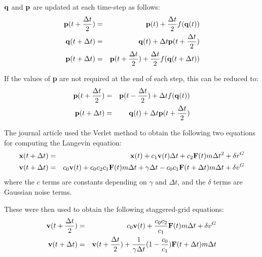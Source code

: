 \documentclass{article}
\begin{document}
${\bf q}$ and ${\bf p}$ are updated at each time-step as follows:
\begin{eqnarray*}
	{\bf p}(t+\frac{\Delta t}{2}) &=& {\bf p}(t) + \frac{\Delta t}{2}f({\bf q}(t))\\
	{\bf q}(t+\Delta t) &=& {\bf q}(t) + \Delta t{\bf p}(t+\frac{\Delta t}{2})\\
	{\bf p}(t+\Delta t) &=& {\bf p}(t+\frac{\Delta t}{2}) + \frac{\Delta t}{2}f({\bf q}(t+\Delta t))
\end{eqnarray*}

If the values of {\bf p} are not required at the end of each step, this can be reduced to:
\begin{eqnarray*}
	{\bf p}(t+\frac{\Delta t}{2}) &=& {\bf p}(t-\frac{\Delta t}{2}) + \Delta tf({\bf q}(t))\\
	{\bf p}(t+\Delta t) &=& {\bf q}(t) + \Delta t{\bf p}(t + \frac{\Delta t}{2})
\end{eqnarray*}

The journal article used the Verlet method to obtain the following two equations for computing the Langevin equation:
\begin{eqnarray*}
	{\bf x}(t+\Delta t) &=& {\bf x}(t) + c_{1}{\bf v}(t)\Delta{t}+c_{2}{\bf F}(t)m\Delta t^{2} + \delta r^{G}\\
	{\bf v}(t+\Delta t) &=& c_{0}{\bf v}(t) + c_{0}c_{2}c_{1}{\bf F}(t)m\Delta t + \gamma\Delta t - c_{0}c_{1}{\bf F}(t+\Delta t)m\Delta t + \delta v^{G}
\end{eqnarray*}
where the $c$ terms are constants depending on $\gamma$ and $\Delta t$, and the $\delta$ terms are Gaussian noise terms.

These were then used to obtain the following staggered-grid equations:
\begin{eqnarray*}
	{\bf v}(t+\frac{\Delta t}{2}) &=& c_{0}{\bf v}(t) + \frac{c_{0}c_{2}}{c_{1}}{\bf F}(t)m\Delta t + \delta v^{G}\\
	{\bf v}(t+\Delta t) &=& {\bf v}(t+\frac{\Delta t}{2}) + \frac{1}{\gamma\Delta t}(1-\frac{c_{0}}{c_{1}}){\bf F}(t+\Delta t)m\Delta t
\end{eqnarray*}
\end{document}
